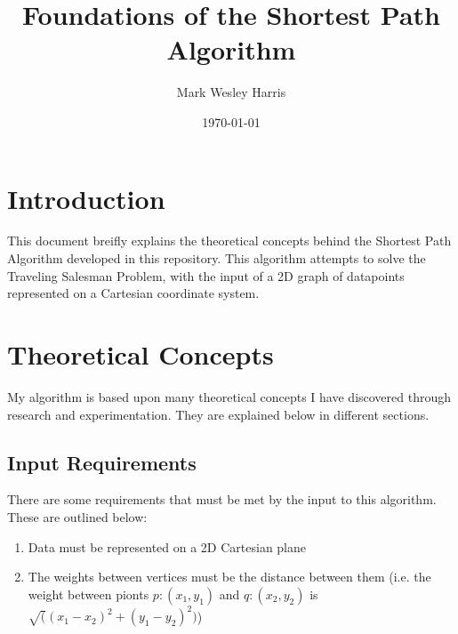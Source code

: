 \documentclass[12pt]{article}
\title{Foundations of the Shortest Path Algorithm}
\author{
Mark Wesley Harris
}
\date{\today}
\begin{document}
\maketitle

\section{Introduction}\label{sec:intro}
This document breifly explains the theoretical concepts behind the
Shortest Path Algorithm developed in this repository. This algorithm attempts
to solve the Traveling Salesman Problem, with the input of a 2D graph of datapoints
represented on a Cartesian coordinate system.

\section{Theoretical Concepts}\label{sec:theory}
My algorithm is based upon many theoretical concepts I have discovered through
research and experimentation. They are explained below in different sections.

\subsection{Input Requirements}\label{subsec:req}
There are some requirements that must be met by the input to this algorithm.
These are outlined below:
\begin{enumerate}
\item Data must be represented on a 2D Cartesian plane
\item The weights between vertices must be the distance between them
(i.e. the weight between pionts $p:(x_1, y_1)$ and $q:(x_2, y_2)$ is $\sqrt((x_1 - x_2)^2 + (y_1 - y_2)^2)$)
\end{enumerate}
\end{document}
